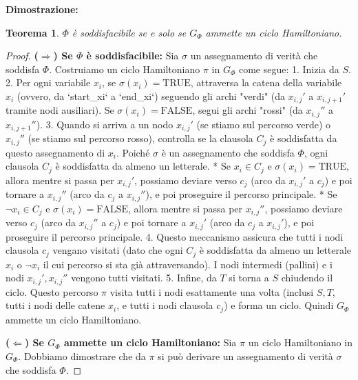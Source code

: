 \documentclass[a4paper]{article}
\newtheorem{theorem}{Teorema}
\begin{document}
\textbf{Dimostrazione:}
\begin{theorem}
$\Phi$ è soddisfacibile se e solo se $G_\Phi$ ammette un ciclo Hamiltoniano.
\end{theorem}
\begin{proof}
\textbf{($\Rightarrow$) Se $\Phi$ è soddisfacibile:}
Sia $\sigma$ un assegnamento di verità che soddisfa $\Phi$. Costruiamo un ciclo Hamiltoniano $\pi$ in $G_\Phi$ come segue:
1.  Inizia da $S$.
2.  Per ogni variabile $x_i$, se $\sigma(x_i) = \text{TRUE}$, attraversa la catena della variabile $x_i$ (ovvero, da `start_xi` a `end_xi`) seguendo gli archi "verdi" (da $x_{i,j}'$ a $x_{i,j+1}'$ tramite nodi ausiliari). Se $\sigma(x_i) = \text{FALSE}$, segui gli archi "rossi" (da $x_{i,j}''$ a $x_{i,j+1}''$).
3.  Quando si arriva a un nodo $x_{i,j}'$ (se stiamo sul percorso verde) o $x_{i,j}''$ (se stiamo sul percorso rosso), controlla se la clausola $C_j$ è soddisfatta da questo assegnamento di $x_i$. Poiché $\sigma$ è un assegnamento che soddisfa $\Phi$, ogni clausola $C_j$ è soddisfatta da almeno un letterale.
    *   Se $x_i \in C_j$ e $\sigma(x_i) = \text{TRUE}$, allora mentre si passa per $x_{i,j}'$, possiamo deviare verso $c_j$ (arco da $x_{i,j}'$ a $c_j$) e poi tornare a $x_{i,j}''$ (arco da $c_j$ a $x_{i,j}''$), e poi proseguire il percorso principale.
    *   Se $\neg x_i \in C_j$ e $\sigma(x_i) = \text{FALSE}$, allora mentre si passa per $x_{i,j}''$, possiamo deviare verso $c_j$ (arco da $x_{i,j}''$ a $c_j$) e poi tornare a $x_{i,j}'$ (arco da $c_j$ a $x_{i,j}'$), e poi proseguire il percorso principale.
4.  Questo meccanismo assicura che tutti i nodi clausola $c_j$ vengano visitati (dato che ogni $C_j$ è soddisfatta da almeno un letterale $x_i$ o $\neg x_i$ il cui percorso si sta già attraversando). I nodi intermedi (pallini) e i nodi $x_{i,j}', x_{i,j}''$ vengono tutti visitati.
5.  Infine, da $T$ si torna a $S$ chiudendo il ciclo.
Questo percorso $\pi$ visita tutti i nodi esattamente una volta (inclusi $S, T$, tutti i nodi delle catene $x_i$, e tutti i nodi clausola $c_j$) e forma un ciclo. Quindi $G_\Phi$ ammette un ciclo Hamiltoniano.

\textbf{($\Leftarrow$) Se $G_\Phi$ ammette un ciclo Hamiltoniano:}
Sia $\pi$ un ciclo Hamiltoniano in $G_\Phi$. Dobbiamo dimostrare che da $\pi$ si può derivare un assegnamento di verità $\sigma$ che soddisfa $\Phi$.


\end{proof}
\end{document}
